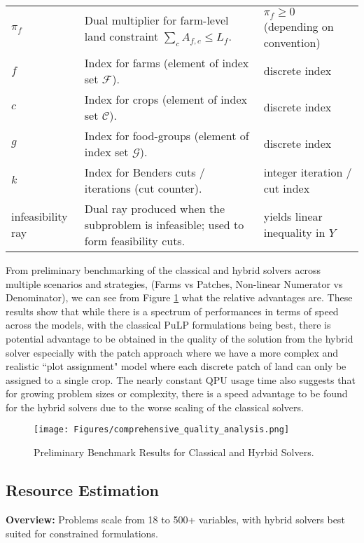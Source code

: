 \begin{table}[ht]
\begin{tabular}{@{} l p{8.5cm} l @{}}
$\pi_f$ & Dual multiplier for farm-level land constraint $\sum_c A_{f,c}\le L_f$. & $\pi_f\ge0$ (depending on convention) \\ 
$f$ & Index for farms (element of index set $\mathcal{F}$). & discrete index \\
$c$ & Index for crops (element of index set $\mathcal{C}$). & discrete index \\
$g$ & Index for food-groups (element of index set $\mathcal{G}$). & discrete index \\
$k$ & Index for Benders cuts / iterations (cut counter). & integer iteration / cut index \\
infeasibility ray & Dual ray produced when the subproblem is infeasible; used to form feasibility cuts. & yields linear inequality in $Y$ \\ \bottomrule
\end{tabular}
\end{table}

From preliminary benchmarking of the classical and hybrid solvers across multiple scenarios and strategies, (Farms vs Patches, Non-linear Numerator vs Denominator), we can see from Figure \ref{fig:comprehensive_quality_analysis} what the relative advantages are. These results show that while there is a spectrum of performances in terms of speed across the models, with the classical PuLP formulations being best, there is potential advantage to be obtained in the quality of the solution from the hybrid solver especially with the patch approach where we have a more complex and realistic ``plot assignment" model where each discrete patch of land can only be assigned to a single crop. The nearly constant QPU usage time also suggests that for growing problem sizes or complexity, there is a speed advantage to be found for the hybrid solvers due to the worse scaling of the classical solvers.

\begin{figure}[t]
    \centering
    \texttt{[image: Figures/comprehensive\_quality\_analysis.png]}
    \caption{Preliminary Benchmark Results for Classical and Hyrbid Solvers.}
    \label{fig:comprehensive_quality_analysis}
\end{figure}


\subsection{Resource Estimation}


\textbf{Overview:}  
 Problems scale from 18 to 500+ variables, with hybrid solvers best suited for constrained formulations.

